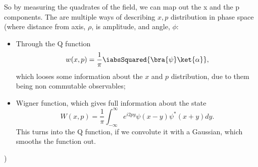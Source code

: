 \begin{framed}\noindent
  So by measuring the quadrates of the  field, we can map out the x and
  the  p components.   The  are multiple  ways of  describing  $ x,p  $
  distribution in  phase space  (where distance  from axis,  $ \rho  $, is
  amplitude, and angle, $ \phi $:
  \begin{itemize}
  \item Through the Q function
    \begin{equation}
      w(x,p) = \frac{1}{\pi}\iabsSquared{\bra{\psi}\ket{\alpha}},
    \end{equation}
    \noindent which looses some  information about the $ x $  and $ p $
    distribution, due to them being non commutable observables;
  \item Wigner function, which gives full information about the state
    \begin{equation}
      W(x,p) = \frac{1}{\pi}\int_{-\infty}^{\infty}e^{i2py}\psi(x-y)\psi^{*}(x+y)dy.
    \end{equation}
    \noindent This turns into the Q function, if we convolute it with a
    Gaussian, which smooths the function out.
  \end{itemize}
  )
\end{framed}

\newpage
